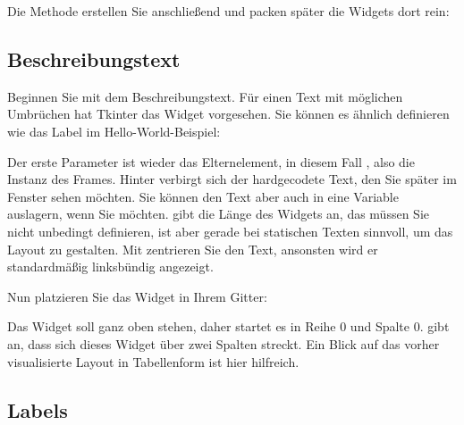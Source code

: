 \medskip


\medskip

Die Methode erstellen Sie anschließend und packen später die Widgets dort rein:
\medskip



\subsection{Beschreibungstext}


Beginnen Sie mit dem Beschreibungstext. Für einen Text mit möglichen Umbrüchen hat Tkinter das Widget  vorgesehen. Sie können es ähnlich definieren wie das Label im Hello-World-Beispiel:

\medskip


\medskip

Der erste Parameter ist wieder das Elternelement, in diesem Fall , also die Instanz des Frames. Hinter  verbirgt sich der hardgecodete Text, den Sie später im Fenster sehen möchten. Sie können den Text aber auch in eine Variable auslagern, wenn Sie möchten.  gibt die Länge des Widgets an, das müssen Sie nicht unbedingt definieren, ist aber gerade bei statischen Texten sinnvoll, um das Layout zu gestalten. Mit  zentrieren Sie den Text, ansonsten wird er standardmäßig linksbündig angezeigt.

Nun platzieren Sie das Widget in Ihrem Gitter:

\medskip


\medskip


Das Widget soll ganz oben stehen, daher startet es in Reihe 0 und Spalte 0.  gibt an, dass sich dieses Widget über zwei Spalten streckt. Ein Blick auf das vorher visualisierte Layout in Tabellenform ist hier hilfreich.

\subsection{Labels}

